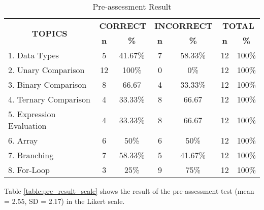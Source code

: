 \begin{longtable}[c]{lcccccc}
\caption{Pre-assessment Result}
\label{table:pre_result}\\ \hline
\multicolumn{1}{c}{\multirow{2}{*}{\textbf{TOPICS}}} & \multicolumn{2}{c}{\textbf{CORRECT}} & \multicolumn{2}{c}{\textbf{INCORRECT}} & \multicolumn{2}{c}{\textbf{TOTAL}} \\
\multicolumn{1}{c}{}                                 & \textbf{n}       & \textbf{\%}       & \textbf{n}        & \textbf{\%}        & \textbf{n}      & \textbf{\%}      \\ \hline
\endfirsthead
%
\endhead
%
1. Data Types                                        & 5                & 41.67\%           & 7                 & 58.33\%            & 12              & 100\%            \\
2. Unary Comparison                                  & 12               & 100\%             & 0                 & 0\%                & 12              & 100\%            \\
3. Binary Comparison                                 & 8                & 66.67             & 4                 & 33.33\%            & 12              & 100\%            \\
4. Ternary Comparison                                & 4                & 33.33\%           & 8                 & 66.67              & 12              & 100\%            \\
5. Expression Evaluation                             & 4                & 33.33\%           & 8                 & 66.67              & 12              & 100\%            \\
6. Array                                             & 6                & 50\%              & 6                 & 50\%               & 12              & 100\%            \\
7. Branching                                         & 7                & 58.33\%           & 5                 & 41.67\%            & 12              & 100\%            \\
8. For-Loop                                         & 3                & 25\%              & 9                 & 75\%               & 12              & 100\%           \\ \hline
\end{longtable}

\parx
Table \ref{table:pre_result_scale} shows the result of the pre-assessment test
(mean = 2.55, SD = 2.17) in the Likert scale.

